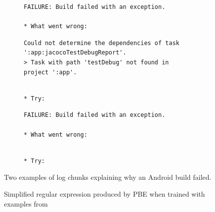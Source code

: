 \begin{figure}[tbp]
  \centering
\begin{subfigure}[tbp]{\columnwidth}
  \begin{lstlisting}[breaklines=true,frame=tlr]
FAILURE: Build failed with an exception.

* What went wrong:
  \end{lstlisting}
  \vspace{-\baselineskip}
  \begin{lstlisting}[backgroundcolor=\color{Cerulean!60},breaklines=true,frame=rl]
Could not determine the dependencies of task ':app:jacocoTestDebugReport'.
> Task with path 'testDebug' not found in project ':app'.
  \end{lstlisting}
  \vspace{-\baselineskip}
  \begin{lstlisting}[breaklines=true,frame=blr]

* Try:
  \end{lstlisting}
\end{subfigure}\hspace{\fill}
\begin{subfigure}[tbp]{\columnwidth}
  \centering
  \begin{lstlisting}[breaklines=true,frame=tlr]
FAILURE: Build failed with an exception.

* What went wrong:
  \end{lstlisting}
  \vspace{-\baselineskip}
  
  \vspace{-\baselineskip}
  \begin{lstlisting}[breaklines=true,frame=blr]

* Try:
  \end{lstlisting}
\end{subfigure}
  \caption{Two examples of log chunks explaining why an Android
  build failed.}
  \label{lst:chunk-example}
\end{figure}

\begin{figure}[tbp]
  \centering
  
  \caption{Simplified regular expression produced by PBE when trained
  with examples from }
  \label{lst:prose-program-simplified}
\end{figure}

